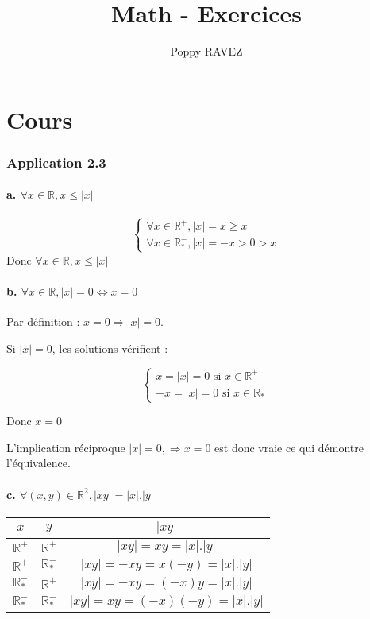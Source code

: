 \documentclass[a4paper,10pt]{report}
\title{Math - Exercices}
\author{Poppy RAVEZ}
\begin{document}

%


\chapter*{Cours}

\subsection*{Application 2.3}

\subsubsection*{a. $\forall x \in \mathbb{R}, x \leq |x|$}

\begin{displaymath}
	\begin{cases}
		\forall x \in \mathbb{R}^{+}, |x| = x \geq x \\
		\forall x \in \mathbb{R}^{-}_{*}, |x| = -x > 0 > x
	\end{cases}
\end{displaymath}
Donc $\forall x \in \mathbb{R}, x \leq |x|$

\subsubsection*{b. $\forall x \in \mathbb{R}, |x| = 0 \Longleftrightarrow x = 0$}

Par définition : $x = 0 \Longrightarrow |x| = 0$.

Si $|x| = 0$, les solutions  vérifient :

\begin{displaymath}
	\begin{cases}
		x = |x| = 0 \text{ si } x \in \mathbb{R}^{+}\\
		-x = |x| = 0 \text{ si } x \in \mathbb{R}^{-}_{*}
	\end{cases}
\end{displaymath}

Donc $x=0$

L'implication réciproque $|x|=0, \Longrightarrow x=0$ est donc vraie ce qui démontre l'équivalence.

\subsubsection*{c. $\forall (x,y) \in \mathbb{R}^2, |xy| = |x|.|y|$}

\begin{tabular}{|c|c|c|}
	\hline
	$x$                  & $y$                  & $|xy|$\\
	\hline
	$\mathbb{R}^{+}$     & $\mathbb{R}^{+}$     & $|xy| = xy = |x|.|y|$ \\
	\hline
	$\mathbb{R}^{+}$     & $\mathbb{R}^{-}_{*}$ & $|xy| = -xy = x(-y) = |x|.|y|$ \\
	\hline
	$\mathbb{R}^{-}_{*}$ & $\mathbb{R}^{+}$     & $|xy| = -xy = (-x)y = |x|.|y|$ \\
	\hline
	$\mathbb{R}^{-}_{*}$ & $\mathbb{R}^{-}_{*}$ & $|xy| = xy =(-x)(-y) = |x|.|y|$ \\
	\hline
\end{tabular}
\end{document}
